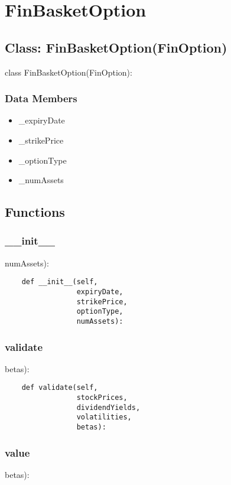 \documentclass[twoside,11pt]{book}
\begin{document}
\newpage
\section{FinBasketOption}

\subsection*{Class: FinBasketOption(FinOption)}
class FinBasketOption(FinOption): 

\subsubsection*{Data Members}
\begin{itemize}
\item{\_expiryDate}
\item{\_strikePrice}
\item{\_optionType}
\item{\_numAssets}
\end{itemize}

\subsection*{Functions}

\subsubsection*{{\bf \_\_init\_\_}}
numAssets): 

\begin{lstlisting}
    def __init__(self,
                 expiryDate,
                 strikePrice,
                 optionType,
                 numAssets):
\end{lstlisting}

\subsubsection*{{\bf validate}}
betas): 

\begin{lstlisting}
    def validate(self,
                 stockPrices,
                 dividendYields,
                 volatilities,
                 betas):
\end{lstlisting}

\subsubsection*{{\bf value}}
betas): 
\end{document}

